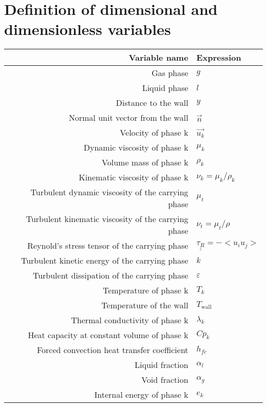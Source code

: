 \documentclass[a4paper,12pt]{report}
\begin{document}
\newpage

\tableofcontents

\pagebreak

\section*{Definition of dimensional and dimensionless variables}
\begin{center}
\begin{tabular}{|r|l|}
	\hline Variable name & Expression \\ \hline \hline
	Gas phase & $g$ \\ \hline
	Liquid phase & $l$ \\ \hline
	Distance to the wall & $y$ \\ \hline
	Normal unit vector from the wall & $\overrightarrow{n}$ \\ \hline
	Velocity of phase k & $\overrightarrow{u_k}$\\ \hline
	Dynamic viscosity of phase k
		& $\mu_k $ \\ \hline
	Volume mass of phase k
		& $\rho_k$ \\ \hline
	Kinematic viscosity of phase k
		& $\nu_k = \mu_k/\rho_k$ \\ \hline
	Turbulent dynamic viscosity of the carrying phase
		& $\mu_{t} $ \\ \hline
	Turbulent kinematic viscosity of the carrying phase
		& $\nu_t = \mu_t/\rho$ \\ \hline
	Reynold's stress tensor of the carrying phase
		& $\underline{\underline{\tau_R}} = - <u_iu_j>$ \\ \hline
	Turbulent kinetic energy of the carrying phase
		& $k$ \\ \hline
	Turbulent dissipation of the carrying phase
		& $\varepsilon$ \\ \hline
	Temperature of phase k
		& $T_{k}$ \\ \hline
	Temperature of the wall
		& $T_\text{wall}$ \\ \hline
	Thermal conductivity of phase k
		& $\lambda_k $ \\ \hline
	Heat capacity at constant volume of phase k
		& $Cp_k$ \\ \hline
	Forced convection heat transfer coefficient
		& $h_{fc}$	\\ \hline
	Liquid fraction
		& $\alpha_l $ \\ \hline
	Void fraction
		& $\alpha_g $ \\ \hline
	Internal energy of phase k
		& $e_k $ \\ \hline

\end{tabular}
\end{center}
\end{document}
